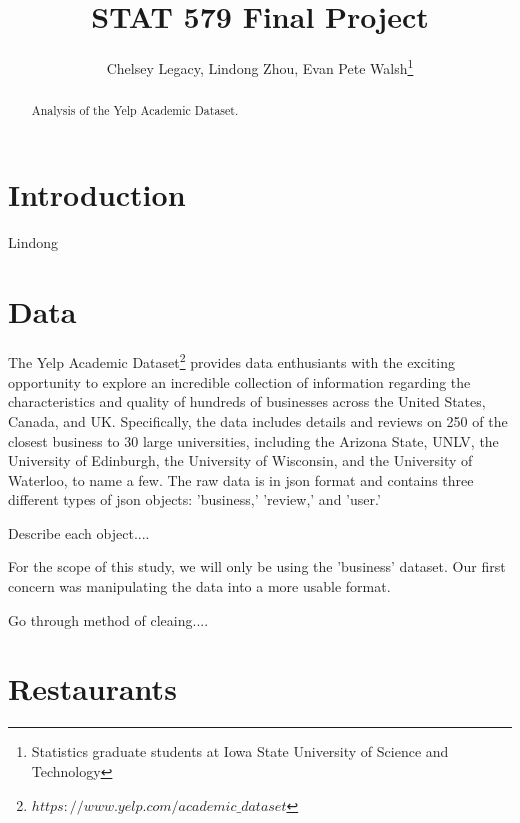 \documentclass[11pt]{article}
\begin{document}
\author{Chelsey Legacy, Lindong Zhou, Evan Pete Walsh\footnote{Statistics graduate students at Iowa State University of Science and Technology}}
\title{STAT 579 Final Project}
\maketitle

\begin{abstract}
Analysis of the Yelp Academic Dataset.
\end{abstract}

\newpage

\tableofcontents

\newpage

\pagestyle{fancy}
\rhead{\thepage}
\rfoot{\today}
\cfoot{}%


\section{Introduction}

Lindong


\section{Data}

The Yelp Academic Dataset\footnote{$https://www.yelp.com/academic\_dataset$} provides data enthusiants with the exciting opportunity to explore an incredible collection of information regarding the characteristics and quality of hundreds of businesses across the United States, Canada, and UK. Specifically, the data includes details and reviews on 250 of the closest business to 30 large universities, including the Arizona State, UNLV, the University of Edinburgh, the University of Wisconsin, and the University of Waterloo, to name a few. The raw data is in json format and contains three different types of json objects: 'business,' 'review,' and 'user.'

Describe each object....

For the scope of this study, we will only be using the 'business' dataset. Our first concern was manipulating the data into a more usable format.

Go through method of cleaing....


\section{Restaurants}
\end{document}
